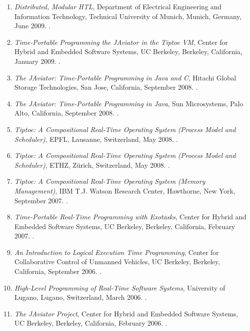 {\begin{enumerate}
\item \emph{Distributed, Modular HTL},
Department of Electrical Engineering and Information Technology, Technical University of Munich, Munich, Germany, June 2009.
.

\item \emph{Time-Portable Programming the JAviator in the Tiptoe VM},
Center for Hybrid and Embedded Software Systems, UC Berkeley, Berkeley, California, January 2009.
.

\item \emph{The JAviator: Time-Portable Programming in Java and C},
Hitachi Global Storage Technologies, San Jose, California, September 2008.
.

\item \emph{The JAviator: Time-Portable Programming in Java},
Sun Microsystems, Palo Alto, California, September 2008.
.

\item \emph{Tiptoe: A Compositional Real-Time Operating System (Process Model and Scheduler)},
EPFL, Lausanne, Switzerland, May 2008.
.

\item \emph{Tiptoe: A Compositional Real-Time Operating System (Process Model and Scheduler)},
ETHZ, Z{\"u}rich, Switzerland, May 2008.
.

\item \emph{Tiptoe: A Compositional Real-Time Operating System (Memory Management)},
IBM T.J. Watson Research Center, Hawthorne, New York, September 2007.
.

\item \emph{Time-Portable Real-Time Programming with Exotasks},
Center for Hybrid and Embedded Software Systems, UC Berkeley, Berkeley, California, February 2007.
.

\item \emph{An Introduction to Logical Execution Time Programming},
Center for Collaborative Control of Unmanned Vehicles, UC Berkeley, Berkeley, California, September 2006.
.

\item \emph{High-Level Programming of Real-Time Software Systems},
University of Lugano, Lugano, Switzerland, March 2006.
.

\item \emph{The JAviator Project},
Center for Hybrid and Embedded Software Systems, UC Berkeley, Berkeley, California, February 2006.
.


\end{enumerate}}

